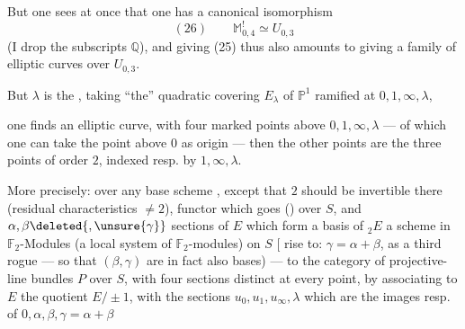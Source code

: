 But one sees at once that one has a canonical isomorphism
\[
(26)\qquad \mathbb{M}_{0,4}^{!}\simeq U_{0,3}
\]
(I drop the subscripts $\mathbb{Q}$), and giving (25) thus also amounts to giving a family of elliptic curves over $U_{0,3}$.

But  $\lambda$ is the , taking ``the'' quadratic covering $E_\lambda$ of  $\mathbb{P}^1$ ramified at $0,1,\infty,\lambda$,


one finds an elliptic curve, with four marked points  above $0,1,\infty,\lambda$ --- of which one can take the point above $0$ as origin --- then the other points are the three points of order $2$, indexed resp. by $1,\infty,\lambda$.

More precisely: over any base scheme , except that $2$ should be invertible there (residual characteristics  $\ne 2$),   functor which goes      ()  over $S$, and  $\alpha,\beta\deleted{,\unsure{\gamma}}$   sections of $E$ which form a basis of ${}_2E$  a  scheme in $\mathbb{F}_2$-Modules (a local system of $\mathbb{F}_2$-modules) on $S$ [ rise to: $\gamma=\alpha+\beta$, as a third rogue --- so that $(\beta,\gamma)$   are in fact also bases) --- to the category of projective-line bundles $P$ over $S$, with four sections   distinct at every point, by associating to $E$ the quotient $E/\pm1$,  with the sections $u_0,u_1,u_\infty,\lambda$ which are the images resp. of $0,\alpha,\beta,\gamma=\alpha+\beta$




